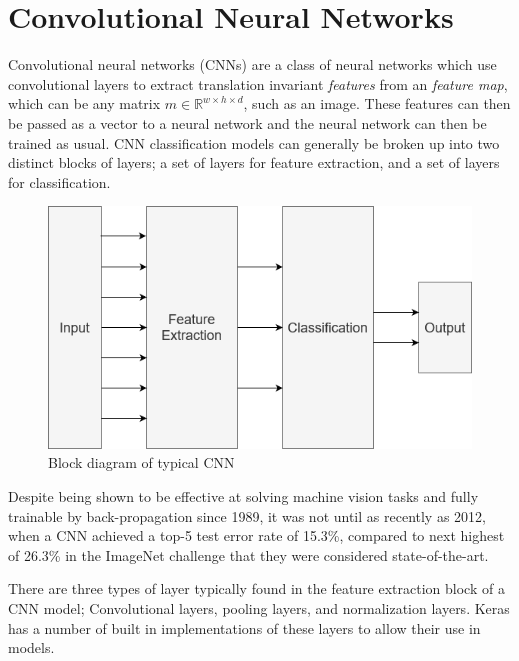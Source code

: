 \documentclass[12pt,a4paper,titlepage]{report}
\begin{document}
\section*{Convolutional Neural Networks}
	Convolutional neural networks (CNNs) are a class of neural networks which use convolutional layers to extract translation invariant \textit{features} from an \textit{feature map}, which can be any matrix $m \in \mathbb{R}^{w \times h \times d}$\cite{cnn-analysis}, such as an image. These features can then be passed as a vector to a neural network and the neural network can then be trained as usual. CNN classification models can generally be broken up into two distinct blocks of layers; a set of layers for feature extraction, and a set of layers for classification. \par
	\begin{figure}[h!]
  		\centering
  		\includegraphics[width=0.7\linewidth]{../final-report/images/cnn_block_diagram.png}
  		\caption{Block diagram of typical CNN}
  		\label{fig:cnn-block}
	\end{figure}
	Despite being shown to be effective at solving machine vision tasks and fully trainable by back-propagation since 1989\cite{cnn-backprop}, it was not until as recently as 2012, when a CNN achieved a top-5 test error rate of 15.3\%, compared to next highest of 26.3\% in the ImageNet challenge\cite{cnn-image-net} that they were considered state-of-the-art. \par
	
	There are three types of layer typically found in the feature extraction block of a CNN model; Convolutional layers, pooling layers, and normalization layers\cite{cnn-analysis}. Keras\cite{keras} has a number of built in  implementations of these layers to allow their use in models.
\end{document}
